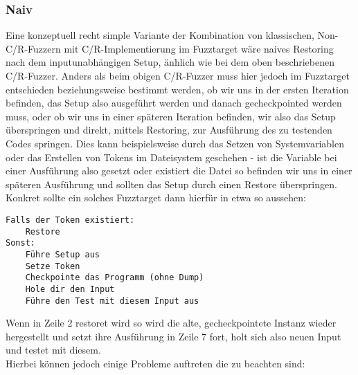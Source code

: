 \documentclass[a4paper]{article}
\begin{document}
\subsubsection{Naiv}
Eine konzeptuell recht simple Variante der Kombination von klassischen, Non-C/R-Fuzzern mit C/R-Implementierung im Fuzztarget wäre naives Restoring nach dem inputunabhängigen Setup, änhlich wie bei dem oben beschriebenen C/R-Fuzzer. 
Anders als beim obigen C/R-Fuzzer muss hier jedoch im Fuzztarget entschieden beziehungsweise bestimmt werden, ob wir uns in der ersten Iteration befinden, das Setup also ausgeführt werden und danach gecheckpointed werden muss, oder ob wir uns in einer späteren Iteration befinden, wir also das Setup überspringen und direkt, mittels Restoring, zur Ausführung des zu testenden Codes springen. 
Dies kann beispielsweise durch das Setzen von Systemvariablen oder das Erstellen von Tokens im Dateisystem geschehen - ist die Variable bei einer Ausführung also gesetzt oder existiert die Datei so befinden wir uns in einer späteren Ausführung und sollten das Setup durch einen Restore überspringen.\\
Konkret sollte ein solches Fuzztarget dann hierfür in etwa so aussehen:
\begin{lstlisting}[caption=Struktur C/R-Fuzztarget für Non-C/R-Fuzzer]
Falls der Token existiert:
    Restore
Sonst:
    Führe Setup aus
    Setze Token
    Checkpointe das Programm (ohne Dump)
    Hole dir den Input
    Führe den Test mit diesem Input aus
\end{lstlisting}
Wenn in Zeile 2 restoret wird so wird die alte, gecheckpointete Instanz wieder hergestellt und setzt ihre Ausführung in Zeile 7 fort, holt sich also neuen Input und testet mit diesem.\\
Hierbei können jedoch einige Probleme auftreten die zu beachten sind:
\end{document}
